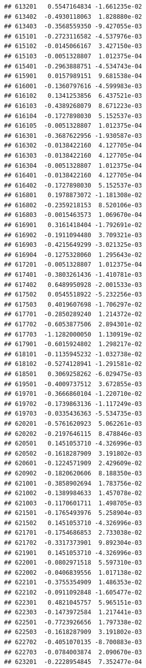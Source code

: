 \documentclass[ignorenonframetext,]{beamer}
\begin{document}
\begin{frame}[fragile]
\begin{verbatim}
## 613201   0.5547164834 -1.661235e-02
## 613402  -0.4930118063  1.828880e-02
## 613403  -0.3568559350 -9.427055e-03
## 615101  -0.2723116582 -4.537976e-03
## 615102  -0.0145066167  3.427150e-03
## 615103  -0.0051328807  1.012375e-04
## 615401  -0.2963888751 -4.534743e-04
## 615901   0.0157989151  9.681538e-04
## 616001  -0.1360797616 -4.599983e-03
## 616102   0.1341253856  6.437521e-03
## 616103  -0.4389268079  8.671223e-03
## 616104  -0.1727898030  5.152537e-03
## 616105  -0.0051328807  1.012375e-04
## 616301  -0.3687622956 -1.930587e-03
## 616302  -0.0138422160  4.127705e-04
## 616303  -0.0138422160  4.127705e-04
## 616304  -0.0051328807  1.012375e-04
## 616401  -0.0138422160  4.127705e-04
## 616402  -0.1727898030  5.152537e-03
## 616801   0.1978873072 -1.181308e-02
## 616802  -0.2359218153  8.520106e-03
## 616803  -0.0015463573  1.069670e-04
## 616901   0.3161418404 -1.792691e-02
## 616902  -0.1911094480  3.709321e-03
## 616903  -0.4215649299 -3.021325e-03
## 616904  -0.1275328060  1.295643e-02
## 617201  -0.0051328807  1.012375e-04
## 617401  -0.3803261436 -1.410781e-03
## 617402   0.6489950928 -2.001533e-03
## 617502   0.0545518922 -5.232256e-03
## 617503   0.4019607698 -1.706297e-02
## 617701  -0.2850289240  1.214372e-02
## 617702  -0.6053877506  2.894301e-02
## 617703  -1.1282000050  1.130919e-02
## 617901  -0.6015924802  1.298217e-02
## 618101  -0.1135945232 -1.032738e-02
## 618102  -0.5274128941 -1.291581e-02
## 618501   0.3069258262 -6.029475e-03
## 619501  -0.4009737512  3.672855e-03
## 619701  -0.3666860104 -1.220710e-02
## 619702  -0.1739863136 -1.117249e-03
## 619703  -0.0335436363 -5.534735e-03
## 620201  -0.5761620923  5.062261e-03
## 620202  -0.2197646115  8.478846e-03
## 620501   0.1451053710 -4.326996e-03
## 620502  -0.1618287909  3.191802e-03
## 620601  -0.1224571909  2.429609e-02
## 620902  -0.1820620606  8.188350e-03
## 621001  -0.3858902694  1.783756e-02
## 621002  -0.1389984633  1.457078e-02
## 621003  -0.1170601711  1.498705e-03
## 621501  -0.1765493976  5.258904e-03
## 621502   0.1451053710 -4.326996e-03
## 621701  -0.1754686853  2.733038e-02
## 621702  -0.3317373901  9.892304e-03
## 621901   0.1451053710 -4.326996e-03
## 622001  -0.0802971518  5.597310e-03
## 622002  -0.0406839556  1.017138e-02
## 622101  -0.3755354909  1.486353e-02
## 622102  -0.0911092848 -1.605477e-02
## 622301   0.4821045757  5.965151e-03
## 622303  -0.1473972584  1.217441e-03
## 622501  -0.7723926656  1.797338e-02
## 622503  -0.1618287909  3.191802e-03
## 622702  -0.4051070135 -8.700883e-03
## 622703  -0.0784003874  2.090670e-03
## 623201  -0.2228954845  7.352477e-04

\end{verbatim}
\end{frame}
\end{document}
